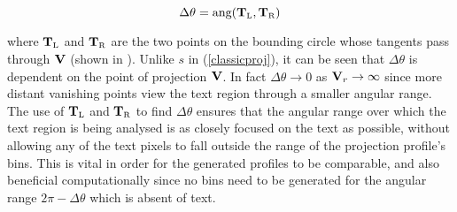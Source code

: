 \begin{equation} \Delta \theta = \mbox{ang}(\myvec{T}_{\mbox{\tiny L}},\myvec{T}_{\mbox{\tiny R}}) \end{equation}

{ \parindent 0mm 
where $\myvec{T}_{\mbox{\tiny L}}$ and $\myvec{T}_{\mbox{\tiny R}}$ are the two
points on the bounding circle whose tangents pass through ${ \bf V }$
(shown
in ).  Unlike $s$ in (\ref{classicproj}), it can be seen that
$\Delta \theta$ is dependent on the point of projection ${ \bf V }$.  In fact
$\Delta \theta \rightarrow 0$ as ${ \bf V }_r \rightarrow \infty$ since more
distant vanishing points view the text region through a smaller angular range.
The use of $\myvec{T}_{\mbox{\tiny L}}$ and $\myvec{T}_{\mbox{\tiny R}}$ to find $\Delta\theta$ ensures that the angular range
over which the text region is being analysed is as closely focused on the text
as possible, without allowing any of the text pixels to fall outside the range
of the projection profile's bins.  This is vital in order for the generated
profiles to be comparable, and also beneficial computationally since no bins
need to be generated for the angular range $2 {\pi}-\Delta \theta$ which is
absent of text.
}

\begin{comment}
Relative to a vanishing point $\myvec{V}$, the text region under examination
will fall entirely within a range of angles, forming an arc or wedge shape
extending from $\myvec{V}$.  The two angles which form this enclosing wedge are
used as the left and right bounds of the projection profile.  Hence all pixels
in the text region will map correctly to a bin in the projection profile, whilst
ensuring that the text fully spans the projection and a useful profile is
obtained.  Without this resizing of the window over which to collect the
projection profile for each vanishing point, the profiles obtained will not
relate to each other.  This is because more distant vanishing points find the
text lying within a smaller angular range, which will produce a drastically
different projection unless we focus on the relevant range.
\end{comment}

